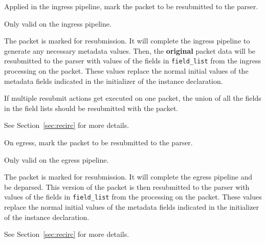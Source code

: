 \documentclass[12pt]{article}
\begin{document}

{%
Applied in the ingress pipeline, mark the packet to be resubmitted to the 
parser.
}
{ %
}
{ %
Only valid on the ingress pipeline.

The packet is marked for resubmission. It will complete the ingress pipeline 
to generate any necessary metadata values. Then, the \textbf{original} packet data 
will be resubmitted to the parser with values of the fields in \texttt{field_list} from 
the ingress processing on the packet. These values replace the normal initial 
values of the metadata fields indicated in the initializer of the instance 
declaration.

If multiple resubmit actions get executed on one packet, the union of all 
the fields in the field lists should be resubmitted with the packet.

See Section~\ref{sec:recirc} for more details.

}


{ %
On egress, mark the packet to be resubmitted to the parser.
}
{ %
}
{ %
Only valid on the egress pipeline.

The packet is marked for resubmission. It will complete the egress pipeline 
and be deparsed.  This version of the packet is then resubmitted to the parser 
with values of the fields in \texttt{field_list} from the processing on the packet. 
These values replace the normal initial values of the metadata fields indicated 
in the initializer of the instance declaration.

See Section~\ref{sec:recirc} for more details.

}

\end{document}
